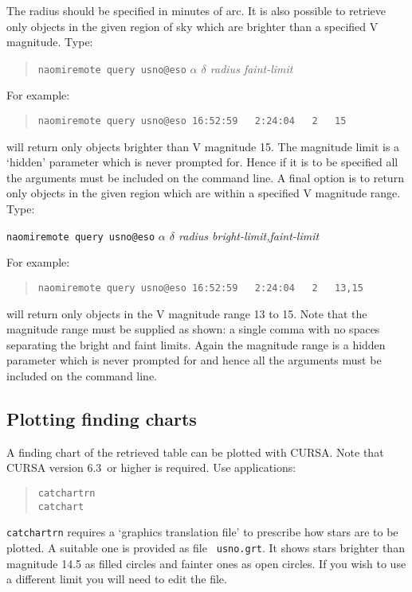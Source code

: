 \documentclass[twoside,11pt]{article}
\newcommand{\CURSAversion}{6.3~}
\renewcommand{\_}{\texttt{\symbol{95}}}
\begin{document}
The radius should be specified in minutes of arc.  It is also possible to
retrieve only objects in the given region of sky which are brighter than
a specified V magnitude.  Type:

\begin{quote}
{\tt naomiremote query usno@eso} {\it $\alpha$ $\delta$ radius faint-limit}
\end{quote}

For example:

\begin{quote}
{\tt naomiremote query usno@eso 16:52:59 ~ 2:24:04 ~ 2 ~ 15}
\end{quote}

will return only objects brighter than V magnitude 15.  The magnitude
limit is a `hidden' parameter which is never prompted for.  Hence if it
is to be specified all the arguments must be included on the command
line.  A final option is to return only objects in the given region
which are within a specified V magnitude range.  Type:

\begin{center}
{\tt naomiremote query usno@eso} {\it $\alpha$ $\delta$ radius
bright-limit,faint-limit}
\end{center}

For example:

\begin{quote}
{\tt naomiremote query usno@eso 16:52:59 ~ 2:24:04 ~ 2 ~ 13,15}
\end{quote}

will return only objects in the V magnitude range 13 to 15.  Note that
the magnitude range must be supplied as shown: a single comma with no spaces
separating the bright and faint limits.  Again the magnitude range is a
hidden parameter which is never prompted for and hence all the arguments
must be included on the command line.

\subsection{Plotting finding charts}

A finding chart of the retrieved table can be plotted with CURSA.  Note
that CURSA version \CURSAversion or higher is required.  Use applications:

\begin{quote}
{\tt catchartrn  \\
catchart}
\end{quote}

{\tt catchartrn} requires a `graphics translation file' to prescribe how
stars are to be plotted.  A suitable one is provided as file {\tt
usno.grt}.  It shows stars brighter than magnitude 14.5 as filled circles
and fainter ones as open circles.  If you wish to use a different limit
you will need to edit the file.
\end{document}
